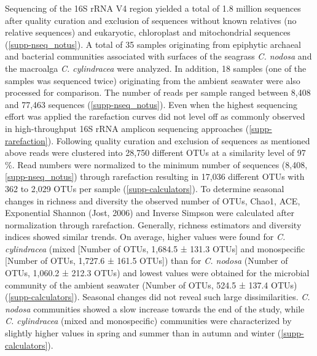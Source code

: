 \documentclass[12pt,]{article}
\begin{document}
Sequencing of the 16S rRNA V4 region yielded a total of 1.8 million
sequences after quality curation and exclusion of sequences without
known relatives (no relative sequences) and eukaryotic, chloroplast and
mitochondrial sequences (\autoref{supp-nseq_notus}). A total of 35
samples originating from epiphytic archaeal and bacterial communities
associated with surfaces of the seagrass \emph{C. nodosa} and the
macroalga \emph{C. cylindracea} were analyzed. In addition, 18 samples
(one of the samples was sequenced twice) originating from the ambient
seawater were also processed for comparison. The number of reads per
sample ranged between 8,408 and 77,463 sequences
(\autoref{supp-nseq_notus}). Even when the highest sequencing effort was
applied the rarefaction curves did not level off as commonly observed in
high-throughput 16S rRNA amplicon sequencing approaches
(\autoref{supp-rarefaction}). Following quality curation and exclusion
of sequences as mentioned above reads were clustered into 28,750
different OTUs at a similarity level of 97 \si{\percent}. Read numbers
were normalized to the minimum number of sequences (8,408,
\autoref{supp-nseq_notus}) through rarefaction resulting in 17,036
different OTUs with 362 to 2,029 OTUs per sample
(\autoref{supp-calculators}). To determine seasonal changes in richness
and diversity the observed number of OTUs, Chao1, ACE, Exponential
Shannon (Jost, 2006) and Inverse Simpson were calculated after
normalization through rarefaction. Generally, richness estimators and
diversity indices showed similar trends. On average, higher values were
found for \emph{C. cylindracea} (mixed {[}Number of OTUs, 1,684.5 ±
131.3 OTUs{]} and monospecific {[}Number of OTUs, 1,727.6 ± 161.5
OTUs{]}) than for \emph{C. nodosa} (Number of OTUs, 1,060.2 ± 212.3
OTUs) and lowest values were obtained for the microbial community of the
ambient seawater (Number of OTUs, 524.5 ± 137.4 OTUs)
(\autoref{supp-calculators}). Seasonal changes did not reveal such large
dissimilarities. \emph{C. nodosa} communities showed a slow increase
towards the end of the study, while \emph{C. cylindracea} (mixed and
monospecific) communities were characterized by slightly higher values
in spring and summer than in autumn and winter
(\autoref{supp-calculators}).
\end{document}
